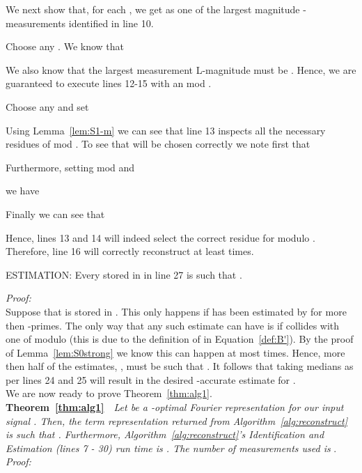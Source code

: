 \documentclass{article}
\begin{document}
We next show that, for each , we get  as one of the  largest magnitude -measurements identified in line 10.

Choose any .  We know that

We also know that the  largest measurement L-magnitude must be .  Hence, we are guaranteed to execute lines 12-15 with an  mod .

Choose any  and set 
  
Using Lemma~\ref{lem:S1-m} we can see that line 13 inspects all the necessary residues of  mod .  To see that  will be chosen correctly we note first that
 
Furthermore, setting  mod  and
 
we have

Finally we can see that 

Hence, lines 13 and 14 will indeed select the correct residue for  modulo .  Therefore, line 16 will correctly reconstruct  at least  times.~~ \\

\begin{Lemma}
ESTIMATION:  Every  stored in  in line 27 is such that .
\label{lem:estimation}
\end{Lemma}

\noindent \textit{Proof:} \\

Suppose that  is stored in .  This only happens if  has been estimated by  for more then  -primes.  The only way that any such estimate can have  is if  collides with one of  modulo  (this is due to the definition of  in Equation~\ref{def:B'}).  By the proof of Lemma~\ref{lem:S0strong} we know this can happen at most  times.  Hence, more then half of the  estimates, , must be such that .  It follows that taking medians as per lines 24 and 25 will result in the desired -accurate estimate for .
~~ \\

We are now ready to prove Theorem~\ref{thm:alg1}.\\

\noindent \textbf{Theorem~\ref{thm:alg1}}~~\textit{Let  be a -optimal Fourier representation for our input signal .  Then, the  term representation  returned from Algorithm~\ref{alg:reconstruct} is such that .  Furthermore, Algorithm~\ref{alg:reconstruct}'s Identification and Estimation (lines 7 - 30) run time is .  The number of measurements used is }.\\

\noindent \textit{Proof:}\\
\end{document}
